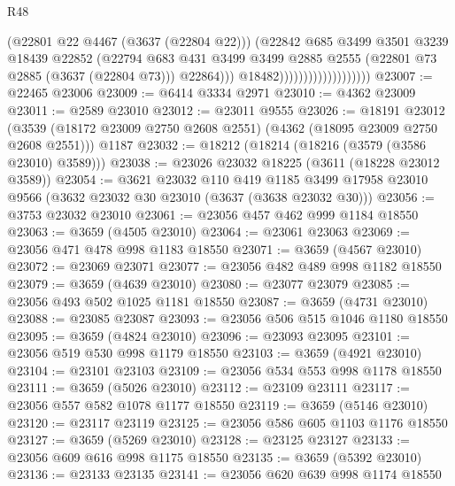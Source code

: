 \begin{lexlean}{R48}
\begin{coremodule}
                                            (@22801 @22 @4467 (@3637 (@22804 @22)))
                                            (@22842
                                              @685
                                              @3499
                                              @3501
                                              @3239
                                              @18439
                                              @22852
                                              (@22794
                                                @683
                                                @431
                                                @3499
                                                @3499
                                                @2885
                                                @2555
                                                (@22801 @73 @2885 (@3637 (@22804 @73)))
                                                @22864)))
                                          @18482)))))))))))))))))))
@23007 := @22465 @23006
@23009 := @6414 @3334 @2971
@23010 := @4362 @23009
@23011 := @2589 @23010
@23012 := @23011 @9555
@23026 := @18191
    @23012
    (@3539 (@18172 @23009 @2750 @2608 @2551) (@4362 (@18095 @23009 @2750 @2608 @2551)))
    @1187
@23032 := @18212 (@18214 (@18216 (@3579 (@3586 @23010) @3589)))
@23038 := @23026 @23032 @18225 (@3611 (@18228 @23012 @3589))
@23054 := @3621
    @23032
    @110
    @419
    @1185
    @3499
    @17958
    @23010
    @9566
    (@3632 @23032 @30 @23010 (@3637 (@3638 @23032 @30)))
@23056 := @3753 @23032 @23010
@23061 := @23056 @457 @462 @999 @1184 @18550
@23063 := @3659 (@4505 @23010)
@23064 := @23061 @23063
@23069 := @23056 @471 @478 @998 @1183 @18550
@23071 := @3659 (@4567 @23010)
@23072 := @23069 @23071
@23077 := @23056 @482 @489 @998 @1182 @18550
@23079 := @3659 (@4639 @23010)
@23080 := @23077 @23079
@23085 := @23056 @493 @502 @1025 @1181 @18550
@23087 := @3659 (@4731 @23010)
@23088 := @23085 @23087
@23093 := @23056 @506 @515 @1046 @1180 @18550
@23095 := @3659 (@4824 @23010)
@23096 := @23093 @23095
@23101 := @23056 @519 @530 @998 @1179 @18550
@23103 := @3659 (@4921 @23010)
@23104 := @23101 @23103
@23109 := @23056 @534 @553 @998 @1178 @18550
@23111 := @3659 (@5026 @23010)
@23112 := @23109 @23111
@23117 := @23056 @557 @582 @1078 @1177 @18550
@23119 := @3659 (@5146 @23010)
@23120 := @23117 @23119
@23125 := @23056 @586 @605 @1103 @1176 @18550
@23127 := @3659 (@5269 @23010)
@23128 := @23125 @23127
@23133 := @23056 @609 @616 @998 @1175 @18550
@23135 := @3659 (@5392 @23010)
@23136 := @23133 @23135
@23141 := @23056 @620 @639 @998 @1174 @18550

\end{coremodule}
\end{lexlean}
